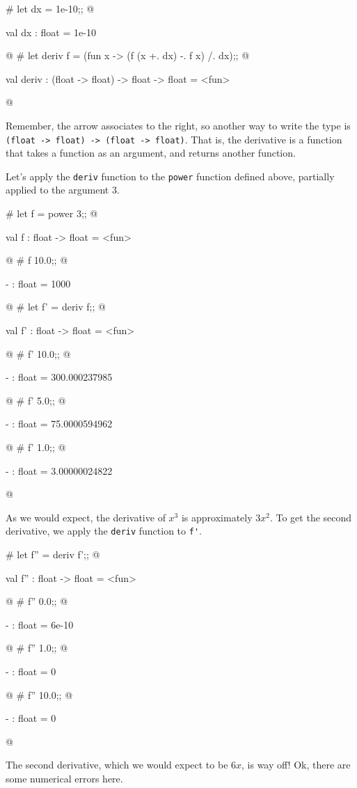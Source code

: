 \begin{ocaml}
# let dx = 1e-10;;
@
\begin{topoutput}
val dx : float = 1e-10
\end{topoutput}
@
# let deriv f =
     (fun x -> (f (x +. dx) -. f x) /. dx);;
@
\begin{topoutput}
val deriv : (float -> float) -> float -> float = <fun>
\end{topoutput}
@
\end{ocaml}
%
Remember, the arrow associates to the right, so another way to write
the type is \hbox{\lstinline/(float -> float) -> (float -> float)/}.  That is, the
derivative is a function that takes a function as an argument, and
returns another function.

Let's apply the \hbox{\lstinline/deriv/} function to the \texttt{power} function defined above, partially
applied to the argument 3.

\begin{ocaml}
# let f = power 3;;
@
\begin{topoutput}
val f : float -> float = <fun>
\end{topoutput}
@
# f 10.0;;
@
\begin{topoutput}
- : float = 1000
\end{topoutput}
@
# let f' = deriv f;;
@
\begin{topoutput}
val f' : float -> float = <fun>
\end{topoutput}
@
# f' 10.0;;
@
\begin{topoutput}
- : float = 300.000237985
\end{topoutput}
@
# f' 5.0;;
@
\begin{topoutput}
- : float = 75.0000594962
\end{topoutput}
@
# f' 1.0;;
@
\begin{topoutput}
- : float = 3.00000024822
\end{topoutput}
@
\end{ocaml}
%
As we would expect, the derivative of $x^3$ is approximately $3x^2$.
To get the second derivative, we apply the \hbox{\lstinline/deriv/} function to
\hbox{\lstinline/f'/}.

\begin{ocaml}
# let f'' = deriv f';;
@
\begin{topoutput}
val f'' : float -> float = <fun>
\end{topoutput}
@
# f'' 0.0;;
@
\begin{topoutput}
- : float = 6e-10
\end{topoutput}
@
# f'' 1.0;;
@
\begin{topoutput}
- : float = 0
\end{topoutput}
@
# f'' 10.0;;
@
\begin{topoutput}
- : float = 0
\end{topoutput}
@
\end{ocaml}
%
The second derivative, which we would expect to be $6x$, is way off!
Ok, there are some numerical errors here.

